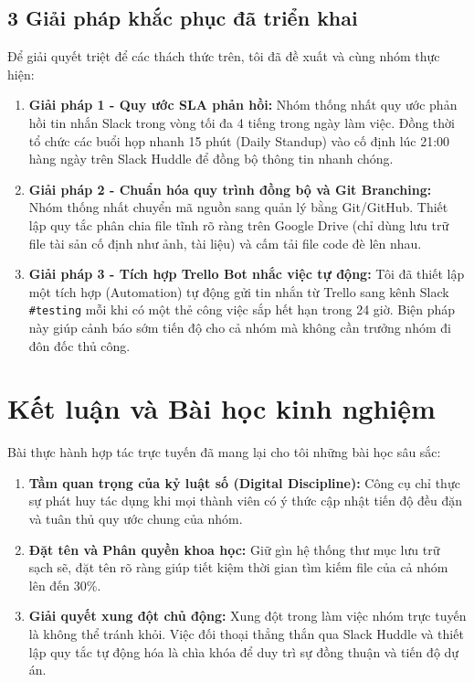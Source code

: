 \documentclass[12pt,a4paper]{article}
\begin{document}
\subsection{3 Giải pháp khắc phục đã triển khai}
Để giải quyết triệt để các thách thức trên, tôi đã đề xuất và cùng nhóm thực hiện:
\begin{enumerate}
    \item \textbf{Giải pháp 1 - Quy ước SLA phản hồi:} Nhóm thống nhất quy ước phản hồi tin nhắn Slack trong vòng tối đa 4 tiếng trong ngày làm việc. Đồng thời tổ chức các buổi họp nhanh 15 phút (Daily Standup) vào cố định lúc 21:00 hàng ngày trên Slack Huddle để đồng bộ thông tin nhanh chóng.
    \item \textbf{Giải pháp 2 - Chuẩn hóa quy trình đồng bộ và Git Branching:} Nhóm thống nhất chuyển mã nguồn sang quản lý bằng Git/GitHub. Thiết lập quy tắc phân chia file tĩnh rõ ràng trên Google Drive (chỉ dùng lưu trữ file tài sản cố định như ảnh, tài liệu) và cấm tải file code đè lên nhau.
    \item \textbf{Giải pháp 3 - Tích hợp Trello Bot nhắc việc tự động:} Tôi đã thiết lập một tích hợp (Automation) tự động gửi tin nhắn từ Trello sang kênh Slack \texttt{\#testing} mỗi khi có một thẻ công việc sắp hết hạn trong 24 giờ. Biện pháp này giúp cảnh báo sớm tiến độ cho cả nhóm mà không cần trưởng nhóm đi đôn đốc thủ công.
\end{enumerate}

\newpage
\section{Kết luận và Bài học kinh nghiệm}
Bài thực hành hợp tác trực tuyến đã mang lại cho tôi những bài học sâu sắc:
\begin{enumerate}
    \item \textbf{Tầm quan trọng của kỷ luật số (Digital Discipline):} Công cụ chỉ thực sự phát huy tác dụng khi mọi thành viên có ý thức cập nhật tiến độ đều đặn và tuân thủ quy ước chung của nhóm.
    \item \textbf{Đặt tên và Phân quyền khoa học:} Giữ gìn hệ thống thư mục lưu trữ sạch sẽ, đặt tên rõ ràng giúp tiết kiệm thời gian tìm kiếm file của cả nhóm lên đến 30\%.
    \item \textbf{Giải quyết xung đột chủ động:} Xung đột trong làm việc nhóm trực tuyến là không thể tránh khỏi. Việc đối thoại thẳng thắn qua Slack Huddle và thiết lập quy tắc tự động hóa là chìa khóa để duy trì sự đồng thuận và tiến độ dự án.
\end{enumerate}
\end{document}
